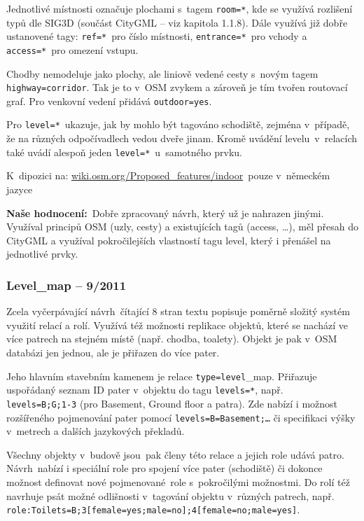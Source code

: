 Jednotlivé místnosti označuje plochami s~tagem \texttt{room=*}, kde se využívá rozlišení typů dle SIG3D (součást CityGML -- viz kapitola 1.1.8). Dále využívá již dobře ustanovené tagy: \texttt{ref=*}~pro číslo místnosti, \texttt{entrance=*}~pro vchody a \texttt{access=*}~pro omezení vstupu.

Chodby nemodeluje jako plochy, ale liniově vedené cesty s~novým tagem \texttt{highway=corridor}. Tak je to v~OSM zvykem a zároveň je tím tvořen routovací graf. Pro venkovní vedení přidává \texttt{outdoor=yes}.

Pro \texttt{level=*}~ukazuje, jak by mohlo být tagováno schodiště, zejména v~případě, že na různých odpočívadlech vedou dveře jinam. Kromě uvádění levelu~v~relacích také uvádí alespoň jeden \texttt{level=*}~u~samotného prvku.

K~dipozici na: \href{http://wiki.osm.org/Proposed\_features/indoor}{wiki.osm.org/Proposed\_features/indoor}~pouze v~německém jazyce

\textbf{Naše hodnocení:}~Dobře zpracovaný návrh, který už je nahrazen jinými. Využíval principů OSM (uzly, cesty) a existujících tagů (access, \ldots{}), měl přesah do CityGML a využíval pokročilejších vlastností tagu level, který i přenášel na jednotlivé prvky.

\subsubsection{Level\_map -- 9/2011}\label{levelux5fmap-92011}

Zcela vyčerpávající návrh~čítající 8 stran textu popisuje poměrně složitý systém využití relací a rolí. Využívá též možnosti replikace objektů, které se nachází ve více patrech na stejném místě (např. chodba, toalety). Objekt je pak v~OSM databázi jen jednou, ale je přiřazen do více pater.

Jeho hlavním stavebním kamenem je relace \texttt{type=level}\_map. Přiřazuje uspořádaný seznam ID pater v~objektu do tagu \texttt{levels=*}, např. \\ \texttt{levels=B;G;1-3} (pro Basement, Ground floor a patra). Zde nabízí i možnost rozšířeného pojmenování pater pomocí \texttt{levels=B=Basement;\ldots{}} či specifikaci výšky v~metrech a dalších jazykových překladů.

Všechny objekty v~budově jsou~pak členy této relace a jejich role udává patro. Návrh~nabízí i speciální role pro spojení více pater (schodiště) či dokonce možnost definovat nové pojmenované~role s~pokročilými možnostmi. Do rolí též navrhuje psát možné odlišnosti v~tagování objektu v~různých patrech, např. \texttt{role:Toilets=B;3[female=yes;male=no];4[female=no;male=yes]}.

